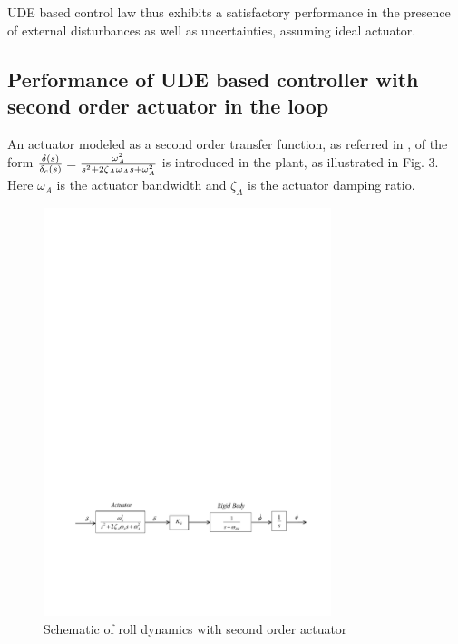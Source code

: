 \documentclass[conference]{IEEEtran}
\begin{document}
UDE based control law thus exhibits a satisfactory performance in the presence of external disturbances as well as uncertainties, assuming ideal actuator.
\subsection{Performance of UDE based controller with second order actuator in the loop}
An actuator modeled as a second order transfer function, as referred in \cite{talole2011}, of the form ${{\delta (s)}\over{\delta_c(s)}} = {{\omega^2_A}\over{s^2 + 2\zeta_A \omega_A s + \omega^2_A}}$ is introduced in the plant, as illustrated in Fig. 3. Here $\omega_A$ is the actuator bandwidth and $\zeta_A$ is the actuator damping ratio.
% 
\begin{figure}[h]
\begin{center}
\includegraphics[width=8.4cm]{fig4}    %
\caption{Schematic of roll dynamics with second order actuator} 
\label{fig3}
\end{center}
\end{figure}
\end{document}
